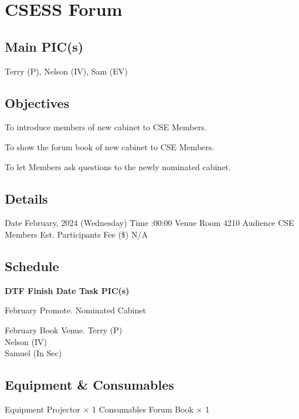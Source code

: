\section{CSESS Forum}

\subsection{Main PIC(s)}
Terry (P), Nelson (IV), Sam (EV)

\subsection{Objectives}
\startitemize
\item To introduce members of new cabinet to CSE Members.
\item To show the forum book of new cabinet to CSE Members.
\item To let Members ask questions to the newly nominated cabinet.
\stopitemize

\subsection{Details}
\starttabulate[|rB|l|]
\NC Date
 February, 2024 (Wednesday) \NR
\NC Time
:00:00 \NR
\NC Venue
\NC Room 4210 \NR
\NC Audience
\NC CSE Members \NR
\NC Est. Participants
 \NR
\NC Fee (\$)
\NC N/A \NR
\stoptabulate

\subsection{Schedule}

\setupTABLE[c][1][width=0.75in]
\setupTABLE[c][2][width=1in]
\setupTABLE[c][3][width=3in]
\setupTABLE[c][4][width=1.25in]
\bTABLE
\bTABLEhead

\bTR\bTH    \bf{DTF}
\eTH\bTH    \bf{Finish Date}
\eTH\bTH    \bf{Task}
\eTH\bTH    \bf{PIC(s)}
\eTH\eTR

\eTABLEhead
\bTABLEbody

\bTR{}
\eTD{} February
\eTD\bTD Promote.
\eTD\bTD Nominated Cabinet
\eTD\eTR

\bTR{}
\eTD{} February
\eTD\bTD Book Venue.
\eTD\bTD Terry (P) \\ Nelson (IV) \\ Samuel (In Sec)
\eTD\eTR

\eTABLEbody
\eTABLE

\subsection{Equipment \& Consumables}
\starttabulate[|l|l|]
\NC{}Equipment\NC\NR
\HL
\NC Projector \NC $\times$ 1 \NR
\HL
\NR
\NC{}Consumables\NC\NR
\HL
\NC Forum Book \NC $\times$ 1 \NR
\HL
\stoptabulate

